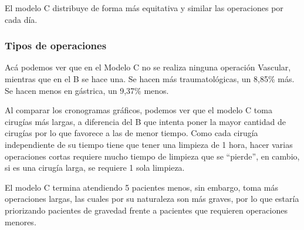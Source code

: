 \documentclass[a4paper,12pt]{book}
\begin{document}
	El modelo C distribuye de forma más equitativa y similar las operaciones por cada día.
	
	\subsubsection*{Tipos de operaciones}
	\begin{table}[htbp]
		\centering
		\caption{Tipos de operaciones y costos asociados}
	\end{table}
	
	Acá podemos ver que en el Modelo C no se realiza ninguna operación Vascular, mientras que en el B se hace una. Se hacen más traumatológicas, un 8,85\% más. Se hacen menos en gástrica, un 9,37\% menos.
	
	Al comparar los cronogramas gráficos, podemos ver que el modelo C toma cirugías más largas, a diferencia del B que intenta poner la mayor cantidad de cirugías por lo que favorece a las de menor tiempo. Como cada cirugía independiente de su tiempo tiene que tener una limpieza de 1 hora, hacer varias operaciones cortas requiere mucho tiempo de limpieza que se ``pierde'', en cambio, si es una cirugía larga, se requiere 1 sola limpieza.
	
	El modelo C termina atendiendo 5 pacientes menos, sin embargo, toma más operaciones largas, las cuales por su naturaleza son más graves, por lo que estaría priorizando pacientes de gravedad frente a pacientes que requieren operaciones menores.
	
\end{document}
